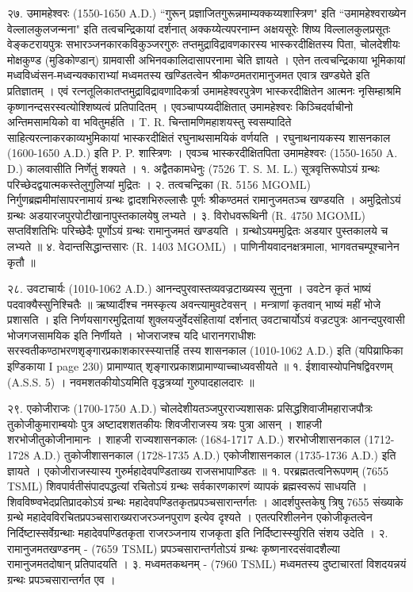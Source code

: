 २७. उमामहेश्वरः (1550-1650 A.D.)
``गुरून् प्रज्ञाजितगुरून्नमाम्यक्कय्यशास्त्रिण" इति ``उमामहेश्वराख्येन वेल्लालकुलजन्मना" इति तत्वचन्द्रिकायां दर्शनात् अक्कय्येत्यपरनाम्न अक्षयसूरेः शिष्य विल्लालकुलप्रसूतः वेङ्कटरायपुत्रः सभारञ्जनकारकविकुञ्जरगुरुः तप्तमुद्राविद्रावणकारस्य भास्करदीक्षितस्य पिता, चोलदेशीयः मोक्षकुण्ड (मुडिकोण्डान्) ग्रामवासी अभिनवकालिदासापरनामा चेति ज्ञायते । एतेन तत्वचन्द्रिकाया भूमिकायां मध्वविध्वंसन-मध्वन्यक्काराभ्यां मध्वमतस्य खण्डितत्वेन श्रीकण्ठमतरामानुजमत एवात्र खण्ड्येते इति प्रतिज्ञातम् । एवं रत्नतूलिकातप्तमुद्राविद्रावणादिकर्त्रा उमामहेश्वरपुत्रेण भास्करदीक्षितेन आत्मनः नृसिम्हाश्रमि कृष्णानन्दसरस्वत्योश्शिष्यत्वं प्रतिपादितम् । एवञ्चाप्पय्यदीक्षितात् उमामहेश्वरः किञ्चिदर्वाचीनो अन्तिमसामयिको वा भवितुमर्हति । T. R. चिन्तामणिमहाशयस्तु स्वसम्पादिते साहित्यरत्नाकरकाव्यभुमिकायां भास्करदीक्षितं रघुनाथसामयिकं वर्णयति । रघुनाथनायकस्य शासनकाल (1600-1650 A.D.) इति P. P. शास्त्रिणः । एवञ्च भास्करदीक्षितपिता उमामहेश्वरः (1550-1650 A. D.) कालवासीति निर्णेतुं शक्यते ।
१. अद्वैतकामधेनुः (7526 T. S. M. L.) सूत्रवृत्तिरूपोऽयं ग्रन्थः परिच्छेदद्वयात्मकस्तेलुगुलिप्यां मुद्रितः ।
२. तत्वचन्द्रिका (R. 5156 MGOML)
निर्गुणब्रह्ममीमांसापरनामायं ग्रन्थः द्वादशभिरुल्लासैः पूर्णः श्रीकण्ठमतं रामानुजमतञ्च खण्डयति । अमुद्रितोऽयं ग्रन्थः अडयारजपुरपोटीखानापुस्तकालयेषु लभ्यते ।
३. विरोधवरूथिनी (R. 4750 MGOML)
सप्तविंशतिभिः परिच्छेदैः पूर्णोऽयं ग्रन्थः रामानुजमतं खण्डयति । ग्रन्थोऽयममुद्रितः अडयार पुस्तकालये च लभ्यते ॥
४. वेदान्तसिद्धान्तसारः (R. 1403 MGOML) । पाणिनीयवादनक्षत्रमाला, भागवतचम्पूश्चानेन कृतौ ॥

२८. उवटाचार्यः (1010-1062 A.D.)
आनन्दपुरवास्तव्यवज्रटाख्यस्य सूनुना ।
उवटेन कृतं भाष्यं पदवाक्यैस्सुनिश्चितैः ॥
ऋष्यार्दीश्च नमस्कृत्य अवन्त्यामुवटेवसन् ।
मन्त्राणां कृतवान् भाष्यं महीं भोजे प्रशासति ।
इति निर्णयसागरमुद्रितायां शुक्लयजुर्वेदसंहितायां दर्शनात् उवटाचार्योऽयं वज्रटपुत्रः आनन्दपुरवासी भोजगजसामयिक इति निर्णीयते । भोजराजश्च यदि धारानगराधीशः सरस्वतीकण्ठाभरणशृङ्गारप्रकाशकारस्स्यात्तर्हि तस्य शासनकाल (1010-1062 A.D.) इति (यपिय्राफिका इण्डिकाया I page 230) प्रामाण्यात् शृङ्गारप्रकाशप्रामाण्याच्चाध्यवसीयते ॥
१. ईशावास्योपनिषद्विवरणम् (A.S.S. 5) । नवमशतकीयोऽयमिति वृद्धत्रय्यां गुरुपादहालदारः ॥

२९.
एकोजीराजः (1700-1750 A.D.)
चोलदेशीयतञ्जपुरराज्यशासकः प्रसिद्धशिवाजीमहाराजपौत्रः तुकोजीकुमाराम्बयोः पुत्र अष्टादशशतकीयः शिवजीराजस्य त्रयः पुत्रा आसन् । शाहजी शरभोजीतुकोजीनामानः । शाहजी राज्यशासनकालः (1684-1717 A.D.) शरभोजीशासनकाल (1712-1728 A.D.) तुकोजीशासनकाल (1728-1735 A.D.) एकोजीशासनकाल (1735-1736 A.D.) इति ज्ञायते । एकोजीराजस्यास्य गुरुर्महादेवपण्डिताख्य राजसभापाण्डितः ॥
१. परब्रह्मतत्वनिरूपणम् (7655 TSML)
शिवपार्वतीसंपादपद्धत्यां रचितोऽयं ग्रन्थः सर्वकारणकारणं व्यापकं ब्रह्मस्वरूपं साधयति । शिवविष्ण्वभेदप्रतिप्रादकोऽयं ग्रन्थः महादेवपण्डितकृतप्रपञ्चसारान्तर्गतः । आदर्शपुस्तकेषु त्रिषु 7655 संख्याके ग्रन्थे महादेवविरचितप्रपञ्चसाराख्यराजरञ्जनपुराण इत्येव दृश्यते । एतत्परिशीलनेन एकोजीकृतत्वेन निर्दिष्टास्सर्वेग्रन्थाः महादेवपण्डितकृता राजरञ्जनाय राजकृता इति निर्दिष्टास्स्युरिति संशय उदेति ।
२. रामानुजमतखण्डनम् - (7659 TSML) प्रपञ्चसारान्तर्गतोऽयं ग्रन्थः कृष्णनारदसंवादशैल्या रामानुजमतदोषान् प्रतिपादयति ।
३. मध्वमतकथनम् - (7960 TSML) मध्वमतस्य दुष्टाचारतां विशदयन्नयं ग्रन्थः प्रपञ्चसारान्तर्गत एव ।

